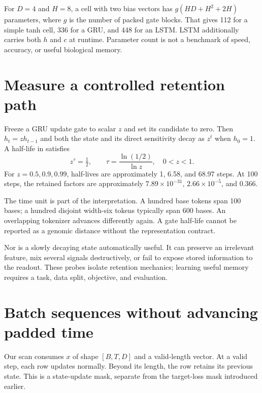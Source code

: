For $D=4$ and $H=8$, a cell with two bias vectors has
$g(HD+H^2+2H)$ parameters, where $g$ is the number of packed gate blocks.
That gives 112 for a simple tanh cell, 336 for a GRU, and 448 for an LSTM.
LSTM additionally carries both $h$ and $c$ at runtime. Parameter count is
not a benchmark of speed, accuracy, or useful biological memory.

\section{Measure a controlled retention path}

Freeze a GRU update gate to scalar $z$ and set its candidate to zero.
Then $h_t=zh_{t-1}$ and both the state and its direct sensitivity decay
as $z^t$ when $h_0=1$. A half-life in  satisfies
\begin{equation}
z^\tau=\tfrac12,\qquad
\tau=\frac{\ln(1/2)}{\ln z},\quad 0<z<1.
\end{equation}
For $z=0.5,0.9,0.99$, half-lives are approximately 1, 6.58, and
68.97 steps. At 100 steps, the retained factors are approximately
$7.89\times10^{-31}$, $2.66\times10^{-5}$, and 0.366.


The time unit is part of the interpretation. A hundred base tokens span
100 bases; a hundred disjoint width-six tokens typically span 600 bases.
An overlapping tokenizer advances differently again. A gate half-life
cannot be reported as a genomic distance without the representation contract.

Nor is a slowly decaying state automatically useful. It can preserve an
irrelevant feature, mix several signals destructively, or fail to expose
stored information to the readout. These probes isolate retention mechanics;
learning useful memory requires a task, data split, objective, and evaluation.

\section{Batch sequences without advancing padded time}

Our scan consumes $x$ of shape $[B,T,D]$ and a valid-length vector.
At a valid step, each row updates normally. Beyond its length, the row
retains its previous state. This is a state-update mask, separate from
the target-loss mask introduced earlier.

